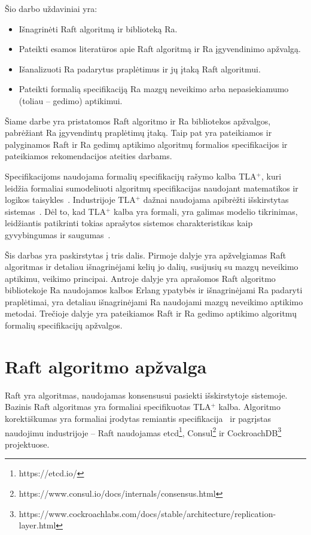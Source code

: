 \documentclass{VUMIFPSkursinis}
\begin{document}
Šio darbo uždaviniai yra:
\begin{itemize}
\item Išnagrinėti Raft algoritmą ir biblioteką Ra.
\item Pateikti esamos literatūros apie Raft algoritmą ir Ra įgyvendinimo apžvalgą.
\item Išanalizuoti Ra padarytus praplėtimus ir jų įtaką Raft algoritmui.
\item Pateikti formalią specifikaciją Ra mazgų neveikimo arba nepasiekiamumo (toliau -- gedimo) aptikimui.
\end{itemize}

Šiame darbe yra pristatomos Raft algoritmo ir Ra bibliotekos apžvalgos, pabrėžiant Ra įgyvendintų praplėtimų įtaką. Taip pat yra pateikiamos ir palyginamos Raft ir Ra gedimų aptikimo algoritmų formalios specifikacijos ir pateikiamos rekomendacijos ateities darbams.

Specifikacijoms naudojama formalių specifikacijų rašymo kalba TLA$^+$, kuri leidžia formaliai sumodeliuoti algoritmų specifikacijas naudojant matematikos ir logikos taisykles~\cite{lamport2002specifying}. Industrijoje TLA$^+$ dažnai naudojama apibrėžti išskirstytas sistemas~\cite{amazon_use_formal_methods}. Dėl to, kad TLA$^+$ kalba yra formali, yra galimas modelio tikrinimas, leidžiantis patikrinti tokias aprašytos sistemos charakteristikas kaip gyvybingumas ir saugumas~\cite{lamport2002specifying}.

Šis darbas yra paskirstytas į tris dalis. Pirmoje dalyje yra apžvelgiamas Raft algoritmas ir detaliau išnagrinėjami kelių jo dalių, susijusių su mazgų neveikimo aptikimu, veikimo principai. Antroje dalyje yra aprašomos Raft algoritmo bibliotekoje Ra naudojamos kalbos Erlang ypatybės ir išnagrinėjami Ra padaryti praplėtimai, yra detaliau išnagrinėjami Ra naudojami mazgų neveikimo aptikimo metodai. Trečioje dalyje yra pateikiamos Raft ir Ra gedimo aptikimo algoritmų formalių specifikacijų apžvalgos.

\section{Raft algoritmo apžvalga}
\label{section:raft_intro}

Raft yra algoritmas, naudojamas konsensusui pasiekti išskirstytoje sistemoje. Bazinis Raft algoritmas yra formaliai specifikuotas TLA$^+$ kalba. Algoritmo korektiškumas yra formaliai įrodytas remiantis specifikacija~\cite{ongaro_consensus} ir pagrįstas naudojimu industrijoje -- Raft naudojamas etcd\footnote{https://etcd.io/}, Consul\footnote{https://www.consul.io/docs/internals/consensus.html} ir CockroachDB\footnote{https://www.cockroachlabs.com/docs/stable/architecture/replication-layer.html} projektuose. 
\end{document}
